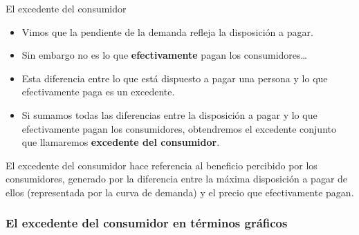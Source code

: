 \documentclass{beamer}
\begin{document}
\begin{frame}{El excedente del consumidor}
  \begin{itemize}
    \item Vimos que la pendiente de la demanda refleja la disposición a pagar.
    \item Sin embargo no es lo que \textbf{efectivamente} pagan los consumidores\dots
    \item Esta diferencia entre lo que está dispuesto a pagar una persona y lo que efectivamente paga es un excedente.
    \item Si sumamos todas las diferencias entre la disposición a pagar y lo que efectivamente pagan los consumidores, obtendremos el excedente conjunto que llamaremos \textbf{excedente del consumidor}.
  \end{itemize}
    \vspace{2mm}
  \begin{boxB}
    \centering
      El excedente del consumidor hace referencia al beneficio percibido por los consumidores, generado por la diferencia entre la máxima disposición a pagar de ellos (representada por la curva de demanda) y el precio que efectivamente pagan.
  \end{boxB}
\end{frame}

\begin{frame}
\frametitle{El excedente del consumidor en términos gráficos}
    \begin{figure}[H]
    \begin{center}
    \end{center}
    \end{figure}
\end{frame}
\end{document}

